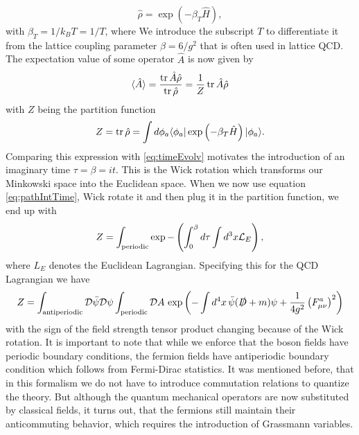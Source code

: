 \begin{equation}
    \hat\rho=\exp(-\beta_T\hat{H}),
\end{equation}
with $\beta_T=1/k_BT=1/T$, where We introduce the subscript $T$ to differentiate it from the lattice coupling parameter $\beta=6/g^2$ that is often used in lattice QCD. The expectation value of some operator $\hat A$ is now given by
\begin{equation}
    \langle\hat A\rangle=\frac{\operatorname{tr}\hat A\hat \rho}{\operatorname{tr} \hat\rho}=\frac{1}{Z}\operatorname{tr} \hat{A}\hat{\rho}
\end{equation}
with $Z$ being the partition function
\begin{equation}
    Z=\operatorname{tr}\hat\rho=\int d\phi_a\langle\phi_a\rvert\exp\left(-\beta_T\hat H\right)\lvert\phi_a\rangle.
\end{equation}
Comparing this expression with \eqref{eq:timeEvolv} motivates the introduction of an imaginary time $\tau=\beta=it$. This is the Wick rotation which transforms our Minkowski space into the Euclidean space. When we now use equation \eqref{eq:pathIntTime}, Wick rotate it and then plug it in the partition function, we end up with
\begin{equation}
    Z=\int_{\text{periodic}}\exp-\left(\int_0^\beta d\tau\int d^3x\mathcal L_E\right),
\end{equation}
where $L_E$ denotes the Euclidean Lagrangian. Specifying this for the QCD Lagrangian we have
\begin{equation}
    Z=\int_{\text{antiperiodic}} \mathcal D\bar \psi\mathcal D\psi\int_{\text{periodic}}\mathcal DA\, \exp\left(-\int d^4x\,\bar\psi(\slashed D+ m)\psi+\frac{1}{4g^2}\left(F_{\mu\nu}^a\right)^2\right)
\end{equation}
with the sign of the field strength tensor product changing because of the Wick rotation. It is important to note that while we enforce that the boson fields have periodic boundary conditions, the fermion fields have antiperiodic boundary condition which follows from Fermi-Dirac statistics. It was mentioned before, that in this formalism we do not have to introduce commutation relations to quantize the theory. But although the quantum mechanical operators are now substituted by classical fields, it turns out, that the fermions still maintain their anticommuting behavior, which requires the introduction of Grassmann variables.\cite{kapusta}

